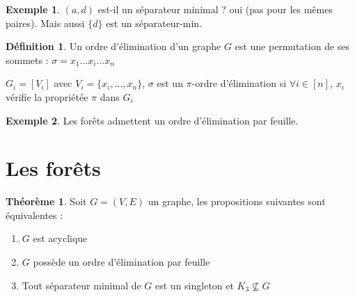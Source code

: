 \documentclass{book}
\theoremstyle{definition}
\newtheorem{theorem}{Théorème}
\newtheorem{definition}{Définition}
\newtheorem{example}{Exemple}
\numberwithin{lemma}{subsection}
\numberwithin{theorem}{subsection}
\numberwithin{definition}{subsection}
\numberwithin{proposition}{subsection}
\numberwithin{corollary}{subsection}
\numberwithin{property}{subsection}
\numberwithin{example}{subsection}
\numberwithin{heuristique}{subsection}
\numberwithin{scenario}{subsection}
\begin{document}
\begin{example}

$(a, d)$ est-il un séparateur minimal ? oui (pas pour les mêmes paires). Mais aussi $\{d\}$ est un séparateur-min.
\end{example}

\begin{definition}
Un ordre d'élimination d'un graphe $G$ est une permutation de ses sommets : $\sigma = x_1 ... x_i ... x_n$

$G_i = [V_i]$ avec $V_i = \{x_i,...,x_n\}$, $\sigma$ est un $\pi$-ordre d'élimination si $\forall i \in [n]$, $x_i$ vérifie la propriétée $\pi$ dans $G_i$
\end{definition}

\begin{example}
Les forêts admettent un ordre d'élimination par feuille.
\end{example}

\section{Les forêts}

\begin{theorem}
Soit $G = (V, E)$ un graphe, les propositions suivantes sont équivalentes :
\begin{enumerate}
    \item $G$ est acyclique
    \item $G$ possède un ordre d'élimination par feuille
    \item Tout séparateur minimal de $G$ est un singleton et $K_3 \nsubseteq G$ 
\end{enumerate}
\end{theorem}
\end{document}
